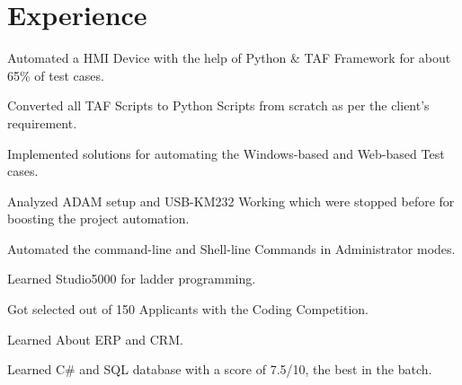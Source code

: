 \documentclass[]{d}
\begin{document}
\hfill
\begin{minipage}[t]{0.66\textwidth} 


\section{Experience}
\vspace{\topsep} %
\begin{tightemize}
\item Automated a HMI Device with the help of Python \& TAF Framework for about 65\% of test cases.
\item Converted all TAF Scripts to Python Scripts from scratch as per the client's requirement.
\item Implemented solutions for automating the Windows-based and Web-based Test cases.
\item Analyzed ADAM setup and USB-KM232 Working which were stopped before for boosting the project automation.
\item Automated the command-line and Shell-line Commands in Administrator modes.
\item Learned Studio5000 for ladder programming.
\end{tightemize}
\sectionsep

\vspace{\topsep} %
\begin{tightemize}
\item Got selected out of 150 Applicants with the Coding Competition.
\item Learned About ERP and CRM.
\item Learned C\# and SQL database with a score of 7.5/10, the best in the batch.
\end{tightemize}
\sectionsep



\end{minipage}
\end{document}
